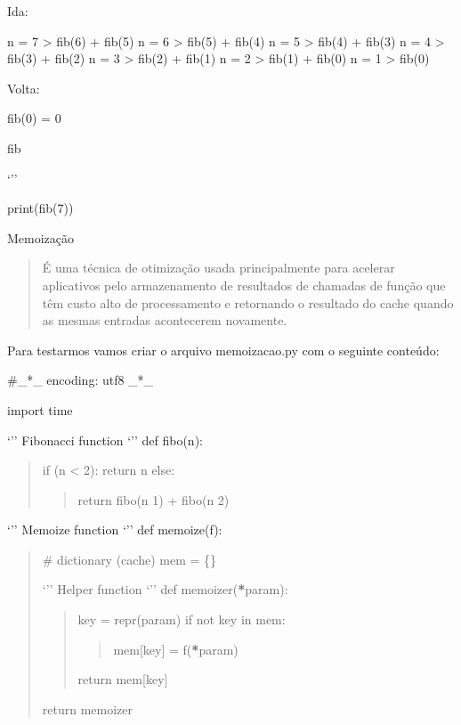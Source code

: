 \documentclass[letterpaper,10pt,brazil]{sphinxmanual}
\begin{document}
Ida:

n = 7 \sphinxhyphen{}\textgreater{} fib(6) + fib(5)
n = 6 \sphinxhyphen{}\textgreater{} fib(5) + fib(4)
n = 5 \sphinxhyphen{}\textgreater{} fib(4) + fib(3)
n = 4 \sphinxhyphen{}\textgreater{} fib(3) + fib(2)
n = 3 \sphinxhyphen{}\textgreater{} fib(2) + fib(1)
n = 2 \sphinxhyphen{}\textgreater{} fib(1) + fib(0)
n = 1 \sphinxhyphen{}\textgreater{} fib(0)

Volta:

fib(0) = 0

fib

‘’’

print(fib(7))

Memoização
\begin{quote}

É uma técnica de otimização usada principalmente para acelerar aplicativos pelo armazenamento de resultados de chamadas de função que têm custo alto de processamento e retornando o resultado do cache quando as mesmas entradas acontecerem novamente.
\end{quote}

Para testarmos vamos criar o arquivo memoizacao.py com o seguinte conteúdo:

\#\_*\_ encoding: utf\sphinxhyphen{}8 \_*\_

import time

‘’’ Fibonacci function ‘’’
def fibo(n):
\begin{quote}

if (n \textless{} 2): return n
else:
\begin{quote}

return fibo(n \sphinxhyphen{} 1) + fibo(n \sphinxhyphen{} 2)
\end{quote}
\end{quote}

‘’’ Memoize function ‘’’
def memoize(f):
\begin{quote}

\# dictionary (cache)
mem = \{\}

‘’’ Helper function ‘’’
def memoizer({\color{red}\bfseries{}*}param):
\begin{quote}

key = repr(param)
if not key in mem:
\begin{quote}

mem{[}key{]} = f({\color{red}\bfseries{}*}param)
\end{quote}

return mem{[}key{]}
\end{quote}

return memoizer
\end{quote}
\end{document}
